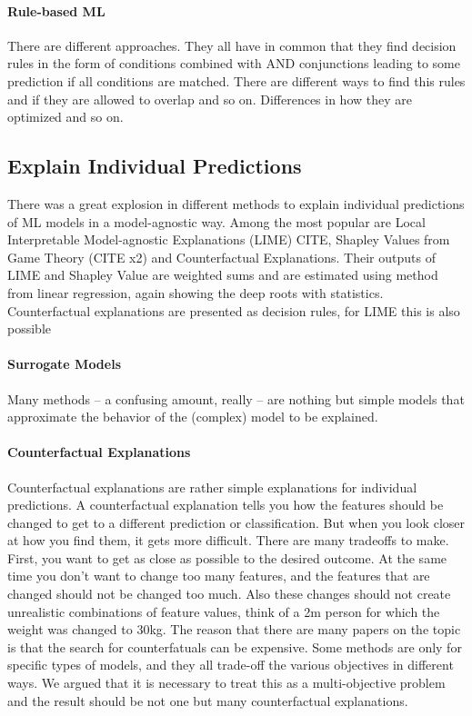 \documentclass[runningheads]{llncs}
\begin{document}
\paragraph{Rule-based ML}
There are different approaches.
They all have in common that they find decision rules in the form of conditions combined with AND conjunctions leading to some prediction if all conditions are matched.
There are different ways to find this rules and if they are allowed to overlap and so on.
Differences in how they are optimized and so on.


\subsection{Explain Individual Predictions}

There was a great explosion in different methods to explain individual predictions of ML models in a model-agnostic way.
Among the most popular are Local Interpretable Model-agnostic Explanations (LIME) CITE, Shapley Values from Game Theory (CITE x2) and Counterfactual Explanations.
Their outputs of LIME and Shapley Value are weighted sums and are estimated using method from linear regression, again showing the deep roots with statistics.
Counterfactual explanations are presented as decision rules, for LIME this is also possible

\paragraph{Surrogate Models}
Many methods -- a confusing amount, really -- are nothing but simple models that approximate the behavior of the (complex) model to be explained.

\paragraph{Counterfactual Explanations}
Counterfactual explanations are rather simple explanations for individual predictions.
A counterfactual explanation tells you how the features should be changed to get to a different prediction or classification.
But when you look closer at how you find them, it gets more difficult.
There are many tradeoffs to make.
First, you want to get as close as possible to the desired outcome.
At the same time you don't want to change too many features, and the features that are changed should not be changed too much.
Also these changes should not create unrealistic combinations of feature values, think of a 2m person for which the weight was changed to 30kg.
The reason that there are many papers on the topic is that the search for counterfatuals can be expensive.
Some methods are only for specific types of models, and they all trade-off the various objectives in different ways.
We argued that it is necessary to treat this as a multi-objective problem and the result should be not one but many counterfactual explanations.
\end{document}
